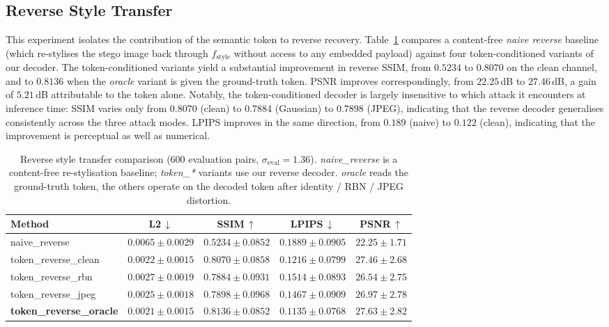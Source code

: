 \documentclass[conference]{IEEEtran}
\begin{document}
\subsection{Reverse Style Transfer}
\label{sec:exp_reverse}
This experiment isolates the contribution of the semantic token to reverse recovery. Table~\ref{tab:reverse} compares a content-free \emph{naive reverse} baseline (which re-stylises the stego image back through $f_{\text{style}}$ without access to any embedded payload) against four token-conditioned variants of our decoder. The token-conditioned variants yield a substantial improvement in reverse SSIM, from $0.5234$ to $0.8070$ on the clean channel, and to $0.8136$ when the \emph{oracle} variant is given the ground-truth token. PSNR improves correspondingly, from $22.25$\,dB to $27.46$\,dB, a gain of $5.21$\,dB attributable to the token alone. Notably, the token-conditioned decoder is largely insensitive to which attack it encounters at inference time: SSIM varies only from $0.8070$ (clean) to $0.7884$ (Gaussian) to $0.7898$ (JPEG), indicating that the reverse decoder generalises consistently across the three attack modes. LPIPS improves in the same direction, from $0.189$ (naive) to $0.122$ (clean), indicating that the improvement is perceptual as well as numerical.

\begin{table}[t]
\centering
\caption{Reverse style transfer comparison ($600$ evaluation pairs, $\sigma_{\text{eval}}\!=\!1.36$). \textit{naive\_reverse} is a content-free re-stylisation baseline; \textit{token\_*} variants use our reverse decoder. \textit{oracle} reads the ground-truth token, the others operate on the decoded token after identity / RBN / JPEG distortion.}
\label{tab:reverse}
\setlength{\tabcolsep}{14pt}
\small
\begin{tabular}{lcccc}
\toprule
\textbf{Method} & \textbf{L2}\,$\downarrow$ & \textbf{SSIM}\,$\uparrow$ & \textbf{LPIPS}\,$\downarrow$ & \textbf{PSNR}\,$\uparrow$ \\
\midrule
naive\_reverse        & $0.0065\pm0.0029$ & $0.5234\pm0.0852$ & $0.1889\pm0.0905$ & $22.25\pm1.71$ \\
\rowcolor{rowshade}
token\_reverse\_clean & $0.0022\pm0.0015$ & $\mathbf{0.8070\pm0.0858}$ & $0.1216\pm0.0799$ & $\mathbf{27.46\pm2.68}$ \\
token\_reverse\_rbn   & $0.0027\pm0.0019$ & $0.7884\pm0.0931$ & $0.1514\pm0.0893$ & $26.54\pm2.75$ \\
\rowcolor{rowshade}
token\_reverse\_jpeg  & $0.0025\pm0.0018$ & $0.7898\pm0.0968$ & $0.1467\pm0.0909$ & $26.97\pm2.78$ \\
\textbf{token\_reverse\_oracle} & $0.0021\pm0.0015$ & $\mathbf{0.8136\pm0.0852}$ & $\mathbf{0.1135\pm0.0768}$ & $27.63\pm2.82$ \\
\bottomrule
\end{tabular}
\end{table}
\end{document}
